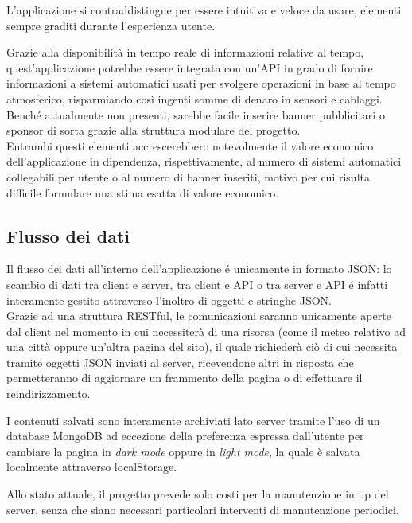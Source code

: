 L'applicazione si contraddistingue per essere intuitiva e veloce da usare, elementi sempre graditi durante l'esperienza utente.

\vspace{5mm}

Grazie alla disponibilità in tempo reale di informazioni relative al tempo, quest'applicazione potrebbe essere integrata con
un'API in grado di fornire informazioni a sistemi automatici usati per svolgere operazioni in base al tempo atmosferico,
risparmiando così ingenti somme di denaro in sensori e cablaggi.\\
Benché attualmente non presenti, sarebbe facile inserire banner pubblicitari o sponsor di sorta grazie alla struttura modulare
del progetto.\\
Entrambi questi elementi accrescerebbero notevolmente il valore economico dell'applicazione in dipendenza, rispettivamente, al
numero di sistemi automatici collegabili per utente o al numero di banner inseriti, motivo per cui risulta difficile formulare
una stima esatta di valore economico.

\subsection{Flusso dei dati}

Il flusso dei dati all'interno dell'applicazione é unicamente in formato JSON: lo scambio di dati tra client e server, tra
client e API o tra server e API é infatti interamente gestito attraverso l'inoltro di oggetti e stringhe JSON.\\
Grazie ad una struttura RESTful, le comunicazioni saranno unicamente aperte dal client nel momento in cui necessiterà di una risorsa
(come il meteo relativo ad una città oppure un'altra pagina del sito), il quale richiederà ciò di cui necessita tramite
oggetti JSON inviati al server, ricevendone altri in risposta che permetteranno di aggiornare un frammento della pagina o di effettuare
il reindirizzamento.

\vspace{5mm}

I contenuti salvati sono interamente archiviati lato server tramite l'uso di un database MongoDB ad eccezione della preferenza
espressa dall'utente per cambiare la pagina in \emph{dark mode} oppure in \emph{light mode}, la quale è salvata localmente attraverso
localStorage.

\vspace{5mm}

Allo stato attuale, il progetto prevede solo costi per la manutenzione in up del server, senza che siano necessari particolari
interventi di manutenzione periodici.


